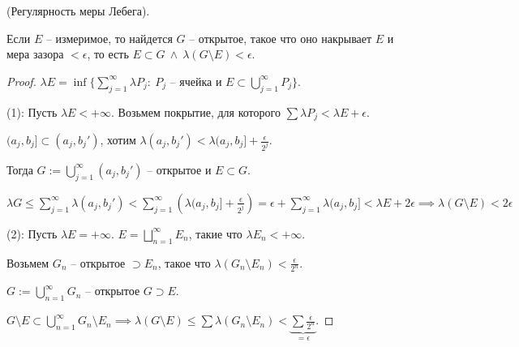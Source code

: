 \begin{theorem}
    (Регулярность меры Лебега).
    
    Если $E$ -- измеримое, то найдется $G$ -- открытое, такое что оно накрывает $E$ и мера зазора $< \epsilon$, то есть $E \subset G \ \land \ \lambda (G \setminus E) < \epsilon$.
\end{theorem}
\begin{proof}
    $\lambda E = \inf \{ \sum_{j=1}^{\infty} \lambda P_j : \ P_j \text{ -- ячейка и } E \subset \bigcup_{j=1}^{\infty} P_j \}$.

    (1): Пусть $\lambda E < + \infty$. Возьмем покрытие, для которого $\sum \lambda P_j < \lambda E + \epsilon$.

    $(a_j, b_j] \subset (a_j, b_j')$, хотим $\lambda (a_j, b_j') < \lambda(a_j, b_j] + \frac{\epsilon}{2^j}$.

    Тогда $G := \bigcup_{j=1}^{\infty} (a_j, b_j')$ -- открытое и $E \subset G$.

    $\lambda G \leq \sum_{j=1}^{\infty} \lambda (a_j, b_j') < \sum_{j=1}^{\infty} \left( \lambda (a_j, b_j] + \frac{\epsilon}{2^j} \right) = \epsilon + \sum_{j=1}^{\infty} \lambda (a_j, b_j] < \lambda E + 2 \epsilon \implies \lambda (G \setminus E) < 2 \epsilon$


    (2): Пусть $\lambda E = +\infty$. $E = \bigsqcup_{n=1}^{\infty} E_n$, такие что $\lambda E_n < +\infty$. 

    Возьмем $G_n$ -- открытое $\supset E_n$, такое что $\lambda (G_n \setminus E_n) < \frac{\epsilon}{2^n}$.
    
    $G:=\bigcup_{n=1}^{\infty} G_n$ -- открытое $G \supset E$.

    $G \setminus E \subset \bigcup_{n=1}^{\infty} G_n \setminus E_n \implies \lambda (G \setminus E) \leq \sum \lambda (G_n \setminus E_n) < \underbrace{\sum \frac{\epsilon}{2^n}}_{= \epsilon}$.
\end{proof}

